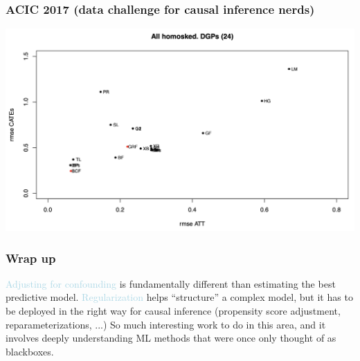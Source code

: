 \documentclass{beamer}
\newcommand{\lb}[1]{\textcolor{lightblue}{#1}}
\begin{document}
\begin{frame}
	\frametitle{ACIC 2017 {\small (data challenge for causal inference nerds)}}
	
	\hspace*{-8mm}\includegraphics[scale=0.32]{figures/acic2}
	
\end{frame}


\begin{frame}
	\frametitle{Wrap up}
	
	\lb{Adjusting for confounding} is fundamentally different than estimating the best predictive model.
\vfill
\lb{Regularization} helps ``structure'' a complex model, but it has to be deployed in the right way for causal inference (propensity score adjustment, reparameterizations, ...)
\vfill
So much interesting work to do in this area, and it involves deeply understanding ML methods that were once only thought of as blackboxes.



\end{frame}
\end{document}
